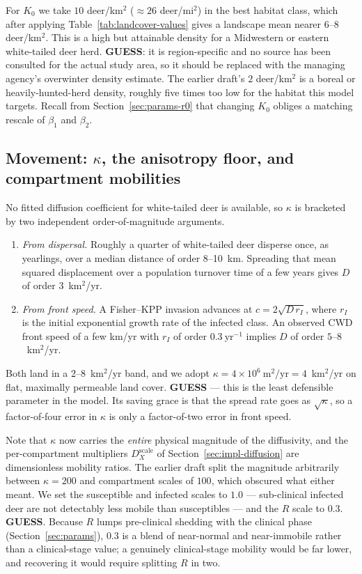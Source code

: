 \documentclass[11pt]{article}
\newcommand{\tagGUESS}{{\footnotesize\textsf{\textbf{\textcolor{red!70!black}{GUESS}}}}}
\begin{document}
For $K_0$ we take $10$ deer/km$^2$ ($\approx 26$ deer/mi$^2$) in the best habitat class, which after applying Table~\ref{tab:landcover-values} gives a landscape mean nearer $6$--$8$ deer/km$^2$. This is a high but attainable density for a Midwestern or eastern white-tailed deer herd. \tagGUESS{}: it is region-specific and no source has been consulted for the actual study area, so it should be replaced with the managing agency's overwinter density estimate. The earlier draft's $2$ deer/km$^2$ is a boreal or heavily-hunted-herd density, roughly five times too low for the habitat this model targets. Recall from Section~\ref{sec:params-r0} that changing $K_0$ obliges a matching rescale of $\beta_1$ and $\beta_2$.

\subsection{Movement: $\kappa$, the anisotropy floor, and compartment mobilities}
\label{sec:params-movement}

No fitted diffusion coefficient for white-tailed deer is available, so $\kappa$ is bracketed by two independent order-of-magnitude arguments.
\begin{enumerate}
\item \emph{From dispersal.} Roughly a quarter of white-tailed deer disperse once, as yearlings, over a median distance of order 8--10~km. Spreading that mean squared displacement over a population turnover time of a few years gives $D$ of order $3$~km$^2$/yr.
\item \emph{From front speed.} A Fisher--KPP invasion advances at $c = 2\sqrt{D\,r_I}$, where $r_I$ is the initial exponential growth rate of the infected class. An observed CWD front speed of a few km/yr with $r_I$ of order $0.3\ \mathrm{yr}^{-1}$ implies $D$ of order $5$--$8$~km$^2$/yr.
\end{enumerate}
Both land in a $2$--$8$~km$^2$/yr band, and we adopt $\kappa = 4\times10^{6}\ \mathrm{m}^2/\mathrm{yr} = 4$~km$^2$/yr on flat, maximally permeable land cover. \tagGUESS{} --- this is the least defensible parameter in the model. Its saving grace is that the spread rate goes as $\sqrt{\kappa}$, so a factor-of-four error in $\kappa$ is only a factor-of-two error in front speed.

Note that $\kappa$ now carries the \emph{entire} physical magnitude of the diffusivity, and the per-compartment multipliers $D_X^{\text{scale}}$ of Section~\ref{sec:impl-diffusion} are dimensionless mobility ratios. The earlier draft split the magnitude arbitrarily between $\kappa = 200$ and compartment scales of $100$, which obscured what either meant. We set the susceptible and infected scales to $1.0$ --- sub-clinical infected deer are not detectably less mobile than susceptibles --- and the $R$ scale to $0.3$. \tagGUESS{}. Because $R$ lumps pre-clinical shedding with the clinical phase (Section~\ref{sec:params}), $0.3$ is a blend of near-normal and near-immobile rather than a clinical-stage value; a genuinely clinical-stage mobility would be far lower, and recovering it would require splitting $R$ in two.
\end{document}
